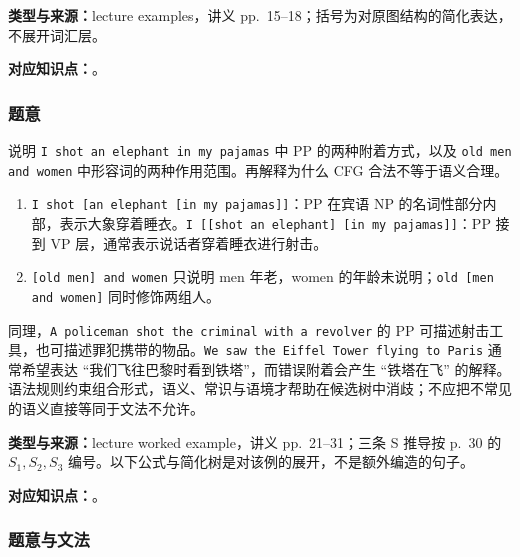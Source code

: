 
\textbf{类型与来源：}lecture examples，讲义 pp.~15--18；括号为对原图结构的简化表达，不展开词汇层。

\textbf{对应知识点：}。

\subsubsection*{题意}

说明 \texttt{I shot an elephant in my pajamas} 中 PP 的两种附着方式，以及 \texttt{old men and women} 中形容词的两种作用范围。再解释为什么 CFG 合法不等于语义合理。

\begin{workedsolution}
\begin{enumerate}
  \item \texttt{I shot [an elephant [in my pajamas]]}：PP 在宾语 NP 的名词性部分内部，表示大象穿着睡衣。\texttt{I [[shot an elephant] [in my pajamas]]}：PP 接到 VP 层，通常表示说话者穿着睡衣进行射击。
  \item \texttt{[old men] and women} 只说明 men 年老，women 的年龄未说明；\texttt{old [men and women]} 同时修饰两组人。
\end{enumerate}
同理，\texttt{A policeman shot the criminal with a revolver} 的 PP 可描述射击工具，也可描述罪犯携带的物品。\texttt{We saw the Eiffel Tower flying to Paris} 通常希望表达 ``我们飞往巴黎时看到铁塔''，而错误附着会产生 ``铁塔在飞'' 的解释。语法规则约束组合形式，语义、常识与语境才帮助在候选树中消歧；不应把不常见的语义直接等同于文法不允许。
\end{workedsolution}


\textbf{类型与来源：}lecture worked example，讲义 pp.~21--31；三条 S 推导按 p.~30 的 $S_1,S_2,S_3$ 编号。以下公式与简化树是对该例的展开，不是额外编造的句子。

\textbf{对应知识点：}。

\subsubsection*{题意与文法}

